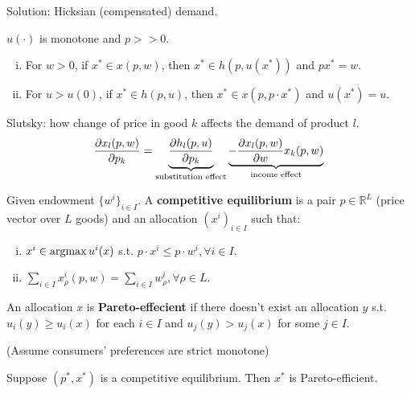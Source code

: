 \documentclass[11pt]{elegantbook}
\newcommand{\argmax}{\operatornamewithlimits{argmax}}
\begin{document}
Solution: Hicksian (compensated) demand.

\begin{proposition}
    $u(\cdot)$ is monotone and $p>>0$.
    \begin{enumerate}[(i).]
        \item For $w>0$, if $x^*\in x(p,w)$, then $x^*\in h(p,u(x^*))$ and $px^*=w$.
        \item For $u>u(0)$, if $x^*\in h(p,u)$, then $x^*\in x(p,p\cdot x^*)$ and $u(x^*)=u$.
    \end{enumerate}
\end{proposition}

Slutsky: how change of price in good $k$ affects the demand of product $l$.
\begin{equation}
    \begin{aligned}
        \frac{\partial x_l(p,w)}{\partial p_k}=\underbrace{\frac{\partial h_l(p,u)}{\partial p_k}}_{\textnormal{substitution effect}}\underbrace{-\frac{\partial x_l(p,w)}{\partial w} x_k(p,w)}_{\textnormal{income effect}}
    \end{aligned}
    \nonumber
\end{equation}

\begin{definition}
    \normalfont
    Given endowment $\{w^i\}_{i\in I}$. A \textbf{competitive equilibrium} is a pair $p\in \mathbb{R}^L$ (price vector over $L$ goods) and an allocation $(x^i)_{i\in I}$ such that:
    \begin{enumerate}[(i).]
        \item $x^i\in \argmax u^i(x)$ s.t. $p\cdot x^i\leq p\cdot w^i, \forall i\in I$.
        \item $\sum_{i\in I}x^i_\rho (p,w)=\sum_{i\in I}w^i_\rho, \forall \rho\in L$.
    \end{enumerate}
\end{definition}

\begin{definition}
    \normalfont
    An allocation $x$ is \textbf{Pareto-effecient} if there doesn't exist an allocation $y$ s.t. $u_i(y)\geq u_i(x)$ for each $i\in I$ and $u_j(y)> u_j(x)$ for some $j\in I$.
\end{definition}

(Assume consumers' preferences are strict monotone)
\begin{theorem}
    Suppose $(p^*,x^*)$ is a competitive equilibrium. Then $x^*$ is Pareto-efficient.
\end{theorem}
\end{document}
